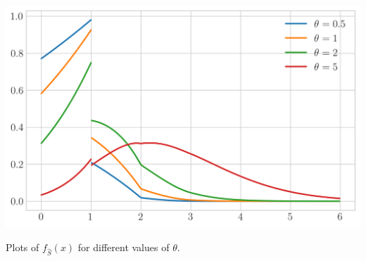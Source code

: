 \documentclass[12pt,pdf,aspectratio=169,t]{beamer}
\begin{document}
\begin{frame}[allowframebreaks]
            \begin{center}
                \includegraphics[scale=0.55]{plots/pdf_sum_hat.png}
    
                Plots of $f_{\widehat{S}}(x)$ for different values of $\theta$.
            \end{center}
    \end{frame}
\end{document}
